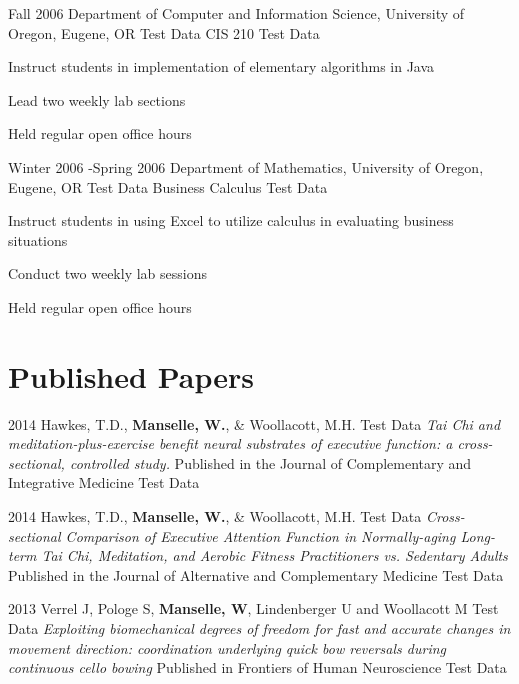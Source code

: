 \documentclass[10pt]{article} %
\begin{document}
\job
{Fall 2006}{}
{Department of Computer and Information Science, University of Oregon, Eugene, OR}
{Test Data}
{CIS 210}
{Test Data}

\begin{itemize-noindent}
\item{Instruct students in implementation of elementary algorithms in Java}
\item{Lead two weekly lab sections}
\item{Held regular open office hours}


\job
{Winter 2006 -}{Spring 2006}
{Department of Mathematics, University of Oregon, Eugene, OR}
{Test Data}
{Business Calculus}
{Test Data}

\begin{itemize-noindent}
\item{Instruct students in using Excel to utilize calculus in evaluating business situations}
\item{Conduct two weekly lab sessions}
\item{Held regular open office hours}
\end{itemize-noindent}


\section{Published Papers}

\job
{2014}
{Hawkes, T.D., \textbf{Manselle, W.}, & Woollacott, M.H.}
{Test Data}
\textit{Tai Chi and meditation-plus-exercise benefit neural substrates of executive function: a cross-sectional, controlled study.}
{Published in the Journal of Complementary and Integrative Medicine}
{Test Data}


\job
{2014}
{Hawkes, T.D., \textbf{Manselle, W.}, & Woollacott, M.H.}
{Test Data}
\textit{Cross-sectional Comparison of Executive Attention Function in Normally-aging Long-term Tai Chi, Meditation, and Aerobic Fitness Practitioners vs. Sedentary Adults}
{Published in the Journal of Alternative and Complementary Medicine}
{Test Data}

\job
{2013}
{Verrel J, Pologe S, \textbf{Manselle, W}, Lindenberger U and Woollacott M}
{Test Data}
\textit{Exploiting biomechanical degrees of freedom for fast and accurate changes in movement direction: coordination underlying quick bow reversals during continuous cello bowing}
{Published in Frontiers of Human Neuroscience}
{Test Data}



\end{itemize-noindent}
\end{document}
